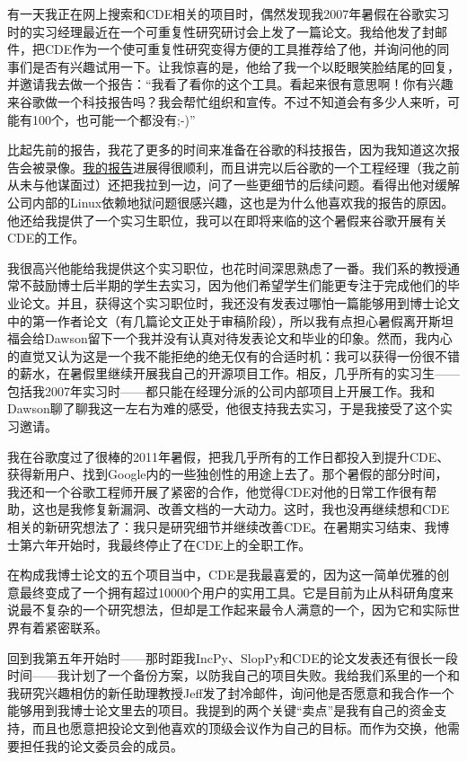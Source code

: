 \documentclass[12pt,UTF8,nofonts]{book}
\begin{document}
有一天我正在网上搜索和CDE相关的项目时，偶然发现我2007年暑假在谷歌实习时的实习经理最近在一个可重复性研究研讨会上发了一篇论文。我给他发了封邮件，把CDE作为一个使可重复性研究变得方便的工具推荐给了他，并询问他的同事们是否有兴趣试用一下。让我惊喜的是，他给了我一个以眨眼笑脸结尾的回复，并邀请我去做一个报告：“我看了看你的这个工具。看起来很有意思啊！你有兴趣来谷歌做一个科技报告吗？我会帮忙组织和宣传。不过不知道会有多少人来听，可能有100个，也可能一个都没有;-)”

比起先前的报告，我花了更多的时间来准备在谷歌的科技报告，因为我知道这次报告会被录像。\href{https://www.youtube.com/watch?feature=player_embedded&v=6XdwHo1BWwY}{我的报告}进展得很顺利，而且讲完以后谷歌的一个工程经理（我之前从未与他谋面过）还把我拉到一边，问了一些更细节的后续问题。看得出他对缓解公司内部的Linux依赖地狱问题很感兴趣，这也是为什么他喜欢我的报告的原因。他还给我提供了一个实习生职位，我可以在即将来临的这个暑假来谷歌开展有关CDE的工作。

我很高兴他能给我提供这个实习职位，也花时间深思熟虑了一番。我们系的教授通常不鼓励博士后半期的学生去实习，因为他们希望学生们能更专注于完成他们的毕业论文。并且，获得这个实习职位时，我还没有发表过哪怕一篇能够用到博士论文中的第一作者论文（有几篇论文正处于审稿阶段），所以我有点担心暑假离开斯坦福会给Dawson留下一个我并没有认真对待发表论文和毕业的印象。然而，我内心的直觉又认为这是一个我不能拒绝的绝无仅有的合适时机：我可以获得一份很不错的薪水，在暑假里继续开展我自己的开源项目工作。相反，几乎所有的实习生——包括我2007年实习时——都只能在经理分派的公司内部项目上开展工作。我和Dawson聊了聊我这一左右为难的感受，他很支持我去实习，于是我接受了这个实习邀请。

我在谷歌度过了很棒的2011年暑假，把我几乎所有的工作日都投入到提升CDE、获得新用户、找到Google内的一些独创性的用途上去了。那个暑假的部分时间，我还和一个谷歌工程师开展了紧密的合作，他觉得CDE对他的日常工作很有帮助，这也是我修复新漏洞、改善文档的一大动力。这时，我也没再继续想和CDE相关的新研究想法了：我只是研究细节并继续改善CDE。在暑期实习结束、我博士第六年开始时，我最终停止了在CDE上的全职工作。

在构成我博士论文的五个项目当中，CDE是我最喜爱的，因为这一简单优雅的创意最终变成了一个拥有超过10000个用户的实用工具。它是目前为止从科研角度来说最不复杂的一个研究想法，但却是工作起来最令人满意的一个，因为它和实际世界有着紧密联系。

\breakline

回到我第五年开始时——那时距我IncPy、SlopPy和CDE的论文发表还有很长一段时间——我计划了一个备份方案，以防我自己的项目失败。我给我们系里的一个和我研究兴趣相仿的新任助理教授Jeff发了封冷邮件，询问他是否愿意和我合作一个能够用到我博士论文里去的项目。我提到的两个关键“卖点”是我有自己的资金支持，而且也愿意把投论文到他喜欢的顶级会议作为自己的目标。而作为交换，他需要担任我的论文委员会的成员。
\end{document}
